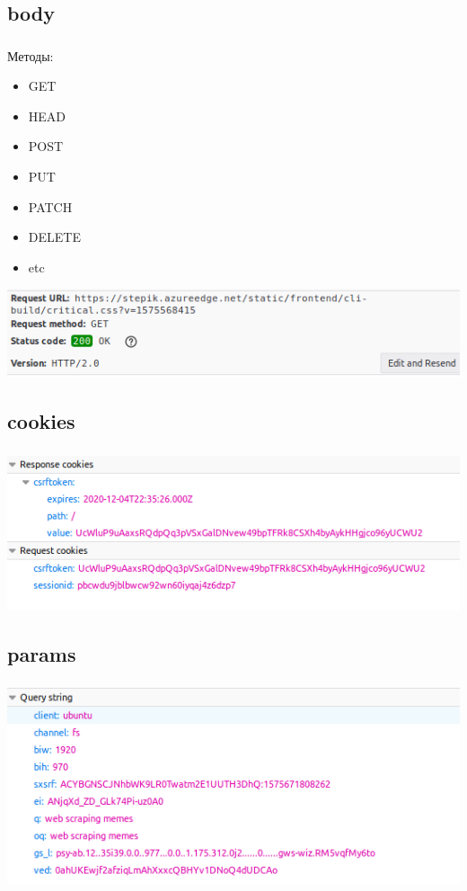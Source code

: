 \documentclass[t, 11pt]{beamer}
\begin{document}
\subsection{body}

\begin{frame}
	\frametitle{\insertsection}
	\frametitle{\insertsubsection}  
	Методы: 
	\begin{itemize}
		\item GET
		\item HEAD
		\item POST
		\item PUT 
		\item PATCH
		\item DELETE
		\item etc
	\end{itemize}
	\includegraphics[width=0.8\linewidth]{req.png}
\end{frame}

\subsection{cookies}

\begin{frame}
	\frametitle{\insertsection}
	\frametitle{\insertsubsection}  
	\includegraphics[width=0.8\linewidth]{cook.png}
\end{frame}


\subsection{params}

\begin{frame}
	\frametitle{\insertsection}
	\frametitle{\insertsubsection}  
	\includegraphics[width=0.8\linewidth]{params.png}
\end{frame}
\end{document}
